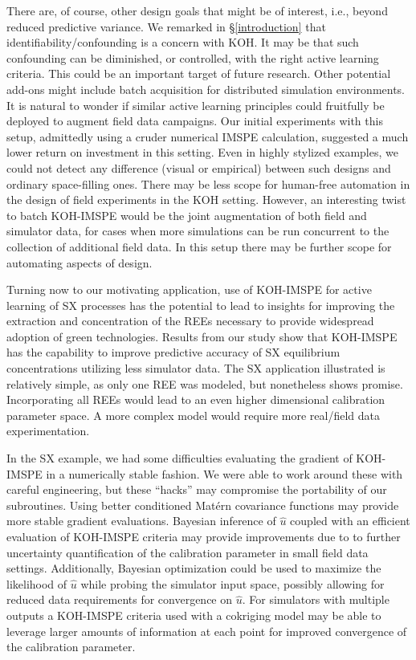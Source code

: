 \documentclass[
]{article}
\begin{document}
There are, of course, other design goals that might be of interest, i.e.,
beyond reduced predictive variance. We remarked in \S \ref{introduction} that
identifiability/confounding is a concern with KOH. It may be that such
confounding can be diminished, or controlled, with the right active learning
criteria. This could be an important target of future research. Other
potential add-ons might include batch acquisition for distributed
simulation environments. It is natural to wonder if similar active learning
principles could fruitfully be deployed to augment field data campaigns. Our
initial experiments with this setup, admittedly using a cruder numerical
IMSPE calculation, suggested a much lower return on investment in this
setting. Even in highly stylized examples, we could not detect any difference
(visual or empirical) between such designs and ordinary space-filling ones. There may be less scope for human-free automation in the design of field experiments in the KOH setting. However, an interesting twist to batch KOH-IMSPE would be the joint augmentation of both field and simulator data, for cases when more simulations can be run concurrent to the collection of additional field data. In this setup there may be further scope for automating aspects of design.

Turning now to our motivating application, use of KOH-IMSPE for active learning of SX processes has the potential to lead to insights for improving the extraction and concentration of the REEs necessary to provide widespread adoption of green technologies. Results from our study show that KOH-IMSPE has the capability to improve predictive accuracy of SX equilibrium concentrations utilizing less simulator data. The SX application illustrated is relatively simple, as only one REE was modeled, but nonetheless shows promise. Incorporating all REEs would lead to an even higher dimensional calibration parameter space. A more complex model would require more real/field data experimentation.

In the SX example, we had some difficulties evaluating the gradient of KOH-IMSPE in a numerically stable fashion. We were able to work around these with careful engineering, but these ``hacks'' may compromise the portability of our subroutines. Using better conditioned Matérn covariance functions \citep{stein1999interpolation} may provide more stable gradient evaluations.
Bayesian inference of \(\hat{u}\) coupled with an efficient evaluation of KOH-IMSPE criteria may provide improvements due to to further uncertainty quantification of the calibration parameter in small field data settings. Additionally, Bayesian optimization \citep{jones1998efficient} could be used to maximize the likelihood of \(\hat{u}\) while probing the simulator input space, possibly allowing for reduced data requirements for convergence on \(\hat{u}\). For simulators with multiple outputs a KOH-IMSPE criteria used with a cokriging model \citep{ver1998constructing} may be able to leverage larger amounts of information at each point for improved convergence of the calibration parameter.
\end{document}
